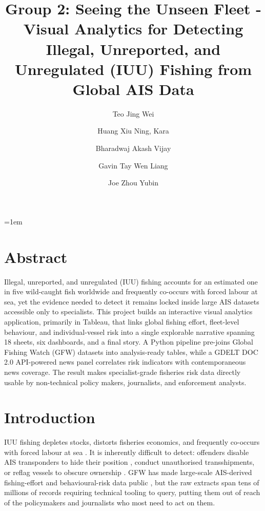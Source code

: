 \documentclass[sigconf]{acmart}
\begin{document}
\emergencystretch=1em

\title{Group 2: Seeing the Unseen Fleet - Visual Analytics for Detecting Illegal, Unreported, and Unregulated (IUU) Fishing from Global AIS Data}

\author{Teo Jing Wei}
\affiliation{}

\author{Huang Xiu Ning, Kara}
\affiliation{}

\author{Bharadwaj Akash Vijay}
\affiliation{}

\author{Gavin Tay Wen Liang}
\affiliation{}

\author{Joe Zhou Yubin}
\affiliation{}

\maketitle

\thispagestyle{empty}
\pagestyle{empty}

\section{Abstract}
Illegal, unreported, and unregulated (IUU) fishing accounts for an estimated one in five wild-caught fish worldwide and frequently co-occurs with forced labour at sea, yet the evidence needed to detect it remains locked inside large AIS datasets accessible only to specialists. This project builds an interactive visual analytics application, primarily in Tableau, that links global fishing effort, fleet-level behaviour, and individual-vessel risk into a single explorable narrative spanning 18 sheets, six dashboards, and a final story. A Python pipeline pre-joins Global Fishing Watch (GFW) datasets into analysis-ready tables, while a GDELT DOC 2.0 API-powered news panel correlates risk indicators with contemporaneous news coverage. The result makes specialist-grade fisheries risk data directly usable by non-technical policy makers, journalists, and enforcement analysts.

\section{Introduction}
IUU fishing depletes stocks, distorts fisheries economics, and frequently co-occurs with forced labour at sea \cite{Selig2022}. It is inherently difficult to detect: offenders disable AIS transponders to hide their position \cite{Welch2022}, conduct unauthorised transshipments, or reflag vessels to obscure ownership \cite{Park2023}. GFW has made large-scale AIS-derived fishing-effort and behavioural-risk data public \cite{Kroodsma2018}, but the raw extracts span tens of millions of records requiring technical tooling to query, putting them out of reach of the policymakers and journalists who most need to act on them.
\end{document}
